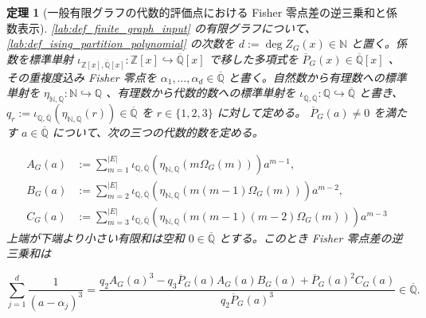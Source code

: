 \documentclass[11pt,a4paper]{article}
\newtheorem{theorem}[definition]{定理}
\theoremstyle{remark}
\begin{document}
\begin{theorem}[一般有限グラフの代数的評価点における Fisher 零点差の逆三乗和と係数表示]\label{lab:theorem_fisher_zero_algebraic_shifted_reciprocal_cube_sum_coefficient_ratio}
\cref{lab:def_finite_graph_input}
 の有限グラフについて、
\cref{lab:def_ising_partition_polynomial}
 の次数を
$d:=\deg Z_G(x)\in\mathbb N$
 と置く。係数を標準単射
$\iota_{\mathbb Z[x],\overline{\mathbb Q}[x]}:\mathbb Z[x]\hookrightarrow\overline{\mathbb Q}[x]$
 で移した多項式を
$\overline P_G(x)\in\overline{\mathbb Q}[x]$
、その重複度込み Fisher 零点を
$\alpha_1,\ldots,\alpha_d\in\overline{\mathbb Q}$
 と書く。自然数から有理数への標準単射を
$\eta_{\mathbb N,\mathbb Q}:\mathbb N\hookrightarrow\mathbb Q$
、有理数から代数的数への標準単射を
$\iota_{\mathbb Q,\overline{\mathbb Q}}:\mathbb Q\hookrightarrow\overline{\mathbb Q}$
 と書き、
$q_r:=\iota_{\mathbb Q,\overline{\mathbb Q}}(\eta_{\mathbb N,\mathbb Q}(r))\in\overline{\mathbb Q}$
 を
$r\in\{1,2,3\}$
 に対して定める。
$\overline P_G(a)\ne0$
 を満たす
$a\in\overline{\mathbb Q}$
 について、次の三つの代数的数を定める。

\[\begin{aligned}
A_G(a)
&:=
\sum_{m=1}^{|E|}
\iota_{\mathbb Q,\overline{\mathbb Q}}\!\left(
  \eta_{\mathbb N,\mathbb Q}\!\left(m\Omega_G(m)\right)
\right)
a^{m-1},\\
B_G(a)
&:=
\sum_{m=2}^{|E|}
\iota_{\mathbb Q,\overline{\mathbb Q}}\!\left(
  \eta_{\mathbb N,\mathbb Q}\!\left(m(m-1)\Omega_G(m)\right)
\right)
a^{m-2},\\
C_G(a)
&:=
\sum_{m=3}^{|E|}
\iota_{\mathbb Q,\overline{\mathbb Q}}\!\left(
  \eta_{\mathbb N,\mathbb Q}\!\left(m(m-1)(m-2)\Omega_G(m)\right)
\right)
a^{m-3}
\end{aligned}\]
上端が下端より小さい有限和は空和
$0\in\overline{\mathbb Q}$
 とする。このとき Fisher 零点差の逆三乗和は

\[\sum_{j=1}^{d}\frac{1}{(a-\alpha_j)^3}
=
\frac{
  \displaystyle
  q_2 A_G(a)^3
  -q_3\overline P_G(a)A_G(a)B_G(a)
  +\overline P_G(a)^2C_G(a)
}{
  q_2\overline P_G(a)^3
}
\in\overline{\mathbb Q}.\]
\end{theorem}
\end{document}
